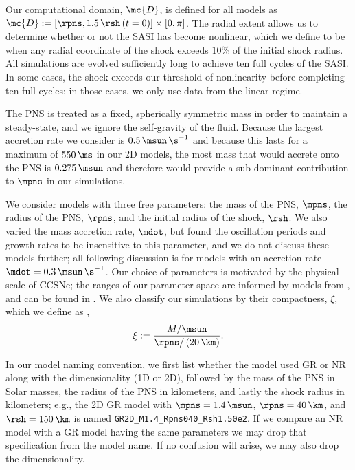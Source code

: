 Our computational domain, $\mc{D}$, is defined for all models as
$\mc{D}:=\left[\rpns,1.5\,\rsh\left(t=0\right)\right]\times\left[0,\pi\right]$.
The radial extent allows us to determine whether or not the SASI
has become nonlinear, which we define to be when any radial coordinate
of the shock exceeds $10\%$ of the initial shock radius.
All simulations are evolved sufficiently long to achieve ten
full cycles of the SASI.
In some cases, the shock exceeds our threshold of nonlinearity before
completing ten full cycles;
in those cases, we only use data from the linear regime.

The PNS is treated as a fixed, spherically symmetric mass
in order to maintain a steady-state,
and we ignore the self-gravity of the fluid.
Because the largest accretion rate we consider
is $0.5\,\msun\,\s^{-1}$ and because this
lasts for a maximum of $550\,\ms$ in our 2D models,
the most mass that would accrete onto the PNS is $0.275\,\msun$
and therefore would provide
a sub-dominant contribution to $\mpns$ in our simulations.

We consider models with three free parameters:
the mass of the PNS, $\mpns$,
the radius of the PNS, $\rpns$,
and the initial radius of the shock, $\rsh$.
We also varied the mass accretion rate, $\mdot$, but found the
oscillation periods and growth rates to be insensitive to this
parameter, and we do not discuss these models further;
all following discussion
is for models with an accretion rate $\mdot=0.3\,\msun\,\s^{-1}$.
Our choice of parameters is motivated by the physical scale of CCSNe;
the ranges of our parameter space are informed
by models from \citet{lmt2001,bmh2013,mjm2015,brv2020,wtj2020},
and can be found in .
We also classify our simulations by their compactness, $\xi$, which we
define as \citep{oo2011},
\begin{equation}
  \xi:=\frac{M/\msun}{\rpns/\left(20\,\km\right)}.
  \label{eq.compactness}
\end{equation}

In our model naming convention,
we first list whether the model used GR or NR along with the dimensionality
(1D or 2D),
followed by the mass of the PNS in Solar masses, the radius of the PNS
in kilometers,
and lastly the shock radius in kilometers; e.g.,
the 2D GR model with $\mpns=1.4\,\msun$, $\rpns=40\,\km$,
and $\rsh=150\,\km$ is named \texttt{GR2D\_M1.4\_Rpns040\_Rsh1.50e2}.
If we compare an NR model with a GR model having the same parameters
we may drop that specification from the model name.
If no confusion will arise, we may also drop the dimensionality.

